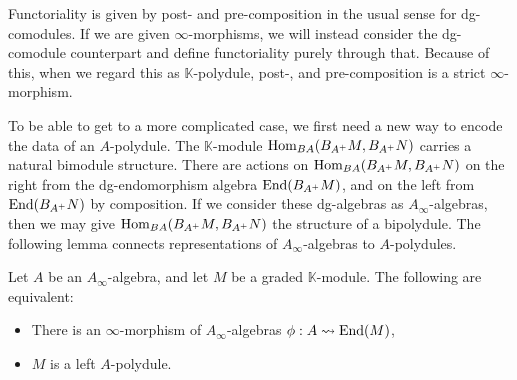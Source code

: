\documentclass[../thesis.tex]{subfiles}
\begin{document}
            Functoriality is given by post- and pre-composition in the usual sense for dg-comodules. If we are given $\infty$-morphisms, we will instead consider the dg-comodule counterpart and define functoriality purely through that. Because of this, when we regard this as $\mathbb{K}$-polydule, post-, and pre-composition is a strict $\infty$-morphism.

            To be able to get to a more complicated case, we first need a new way to encode the data of an $A$-polydule. The $\mathbb{K}$-module $\tt{Hom}_{BA}(B_{A^+}M,B_{A^+}N)$ carries a natural bimodule structure. There are actions on $\tt{Hom}_{BA}(B_{A^+}M,B_{A^+}N)$ on the right from the dg-endomorphism algebra $\tt{End}(B_{A^+}M)$, and on the left from $\tt{End}(B_{A^+}N)$ by composition. If we consider these dg-algebras as $A_\infty$-algebras, then we may give $\tt{Hom}_{BA}(B_{A^+}M, B_{A^+}N)$ the structure of a bipolydule.  The following lemma connects representations of $A_\infty$-algebras to $A$-polydules.

            \begin{lemma}\label{lem: rep}
                Let $A$ be an $A_\infty$-algebra, and let $M$ be a graded $\mathbb{K}$-module. The following are equivalent:
                \begin{itemize}
                    \item There is an $\infty$-morphism of $A_\infty$-algebras $\phi: A \rightsquigarrow \tt{End}(M)$,
                    \item $M$ is a left $A$-polydule.
                \end{itemize}
            \end{lemma}
\end{document}

